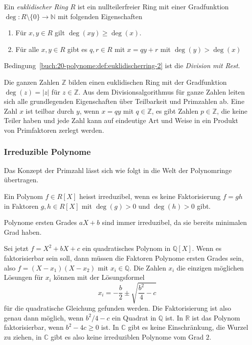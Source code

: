 \begin{definition}
Ein {\em euklidischer Ring} $R$ ist ein nullteilerfreier Ring mit einer
%
Gradfunktion $\deg\colon R\setminus\{0\}\to\mathbb{N}$ mit folgenden
Eigenschaften
\begin{enumerate}
\item Für $x,y\in R$ gilt $\deg(xy) \ge \deg(x)$.
\item Für alle $x,y\in R$ gibt es $q,r\in R$ mit $x=qy+r$ mit
$\deg(y)>\deg(x)$
\label{buch:20-polynome:def:euklidischerring-2}
\end{enumerate}
Bedingung~\ref{buch:20-polynome:def:euklidischerring-2} ist die
{\em Division mit Rest}.
%
%
%
\end{definition}

Die ganzen Zahlen $\mathbb{Z}$ bilden einen euklidischen Ring mit der 
Gradfunktion $\deg(z)=|z|$ für $z\in \mathbb{Z}$.
Aus dem Divisionsalgorithmus für ganze Zahlen leiten sich alle grundlegenden
Eigenschaften über Teilbarkeit und Primzahlen ab.
Eine Zahl $x$ ist teilbar durch $y$, wenn $x=qy$ mit $q\in \mathbb{Z}$,
es gibt Zahlen $p\in\mathbb{Z}$, die keine Teiler haben und jede Zahl
kann auf eindeutige Art und Weise in ein Produkt von Primfaktoren
zerlegt werden.

\subsubsection{Irreduzible Polynome}
Das Konzept der Primzahl lässt sich wie folgt in die Welt der Polynomringe
übertragen.
%

\begin{definition}
Ein Polynom $f\in R[X]$ heisst irreduzibel, wenn es keine Faktorisierung $f=gh$
in Faktoren $g,h\in R[X]$ mit $\deg(g)>0$ und $\deg(h) >0$ gibt.
%
\end{definition}

\begin{beispiel}
Polynome ersten Grades $aX+b$ sind immer irreduzibel, da sie bereits
minimalen Grad haben.

Sei jetzt $f=X^2+bX+c$ ein quadratisches Polynom in $\mathbb{Q}[X]$.
Wenn es faktorisierbar sein soll, dann müssen die Faktoren Polynome
ersten Grades sein, also $f=(X-x_1)(X-x_2)$ mit $x_i\in\mathbb{Q}$.
Die Zahlen $x_i$ die einzigen möglichen Lösungen für $x_i$ können mit
der Lösungsformel
\[
x_i = -\frac{b}2\pm\sqrt{\frac{b^2}{4}-c}
\]
für die quadratische Gleichung
gefunden werden.
Die Faktorisierung ist also genau dann möglich, wenn $b^2/4-c$ ein 
Quadrat in $\mathbb{Q}$ ist.
In $\mathbb{R}$ ist das Polynom faktorisierbar, wenn $b^2-4c\ge 0$ ist.
In $\mathbb{C}$ gibt es keine Einschränkung, die Wurzel zu ziehen,
in $\mathbb{C}$ gibt es also keine irreduziblen Polynome vom Grad $2$.
\end{beispiel}

